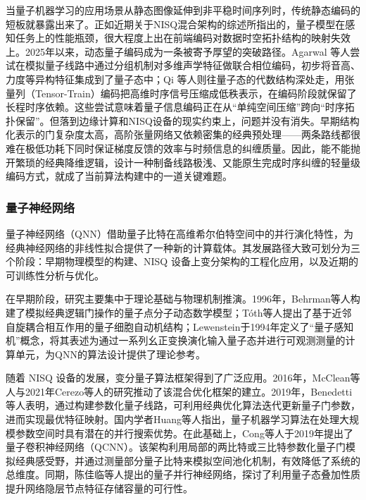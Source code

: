 当量子机器学习的应用场景从静态图像延伸到非平稳时间序列时，传统静态编码的短板就暴露出来了。正如近期关于NISQ混合架构的综述所指出的，量子模型在感知任务上的性能瓶颈，很大程度上出在前端编码对数据时空拓扑结构的映射失效上。2025年以来，动态量子编码成为一条被寄予厚望的突破路径。Agarwal 等人尝试在模拟量子线路中通过分组机制对多维声学特征做联合相位编码，初步将音高、力度等异构特征集成到了量子态中；Qi 等人则往量子态的代数结构深处走，用张量列（Tensor-Train）编码把高维时序信号压缩成低秩表示，在编码阶段就保留了长程时序依赖。这些尝试意味着量子信息编码正在从“单纯空间压缩”跨向“时序拓扑保留”。但落到边缘计算和NISQ设备的现实约束上，问题并没有消失。早期结构化表示的门复杂度太高，高阶张量网络又依赖密集的经典预处理——两条路线都很难在极低功耗下同时保证梯度反馈的效率与时频信息的纠缠质量。因此，能不能抛开繁琐的经典降维逻辑，设计一种制备线路极浅、又能原生完成时序纠缠的轻量级编码方式，就成了当前算法构建中的一道关键难题。

\subsubsection{量子神经网络}  

量子神经网络（QNN）借助量子比特在高维希尔伯特空间中的并行演化特性，为经典神经网络的非线性拟合提供了一种新的计算载体。其发展路径大致可划分为三个阶段：早期物理模型的构建、NISQ 设备上变分架构的工程化应用，以及近期的可训练性分析与优化。

在早期阶段，研究主要集中于理论基础与物理机制推演。1996年，Behrman等人构建了模拟经典逻辑门操作的量子点分子动态数学模型；Tóth等人提出了基于近邻自旋耦合相互作用的量子细胞自动机结构；Lewenstein于1994年定义了“量子感知机”概念，将其表述为通过一系列幺正变换演化输入量子态并进行可观测测量的计算单元，为QNN的算法设计提供了理论参考。

随着 NISQ 设备的发展，变分量子算法框架得到了广泛应用。2016年，McClean等人与2021年Cerezo等人的研究推动了该混合优化框架的建立。2019年，Benedetti等人表明，通过构建参数化量子线路，可利用经典优化算法迭代更新量子门参数，进而实现最优特征映射。国内学者Huang等人指出，量子机器学习算法在处理大规模参数空间时具有潜在的并行搜索优势。在此基础上，Cong等人于2019年提出了量子卷积神经网络（QCNN）。该架构利用局部的两比特或三比特参数化量子门模拟经典感受野，并通过测量部分量子比特来模拟空间池化机制，有效降低了系统的总维度。同期，陈佳临等人提出的量子并行神经网络，探讨了利用量子态叠加性质提升网络隐层节点特征存储容量的可行性。


